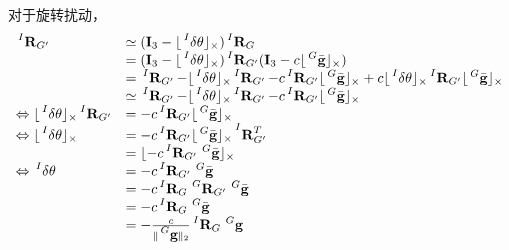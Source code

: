 \documentclass{article}
\begin{document}
\par
对于旋转扰动，
\begin{equation}
    \begin{array}{ll}
        \sideset{^I}{}{\mathop{\textbf{R}_{G'}}}&\simeq (\textbf{I}_3-
        \lfloor\sideset{^I}{}{\mathop{\delta\mathbf{\theta}}}\rfloor_{\times})\sideset{^I}{}{\mathop{\textbf{R}_{G}}}\\
        &=(\textbf{I}_3-\lfloor\sideset{^I}{}{\mathop{\delta\mathbf{\theta}}}\rfloor_{\times})\sideset{^I}{}{\mathop{\textbf{R}_{G'}}}
        (\textbf{I}_3-c\lfloor\sideset{^G}{}{\mathop{\bar{\textbf{g}}}}\rfloor_{\times})\\
        &=\sideset{^I}{}{\mathop{\textbf{R}_{G'}}}-\lfloor\sideset{^I}{}{\mathop{\delta\mathbf{\theta}}}\rfloor_{\times}
        \sideset{^I}{}{\mathop{\textbf{R}_{G'}}}-c\sideset{^I}{}{\mathop{\textbf{R}_{G'}}}
        \lfloor\sideset{^G}{}{\mathop{\bar{\textbf{g}}}}\rfloor_{\times}
        +c\lfloor\sideset{^I}{}{\mathop{\delta\mathbf{\theta}}}\rfloor_{\times}\sideset{^I}{}{\mathop{\textbf{R}_{G'}}}
        \lfloor\sideset{^G}{}{\mathop{\bar{\textbf{g}}}}\rfloor_{\times}\\
        &\simeq \sideset{^I}{}{\mathop{\textbf{R}_{G'}}}-\lfloor\sideset{^I}{}{\mathop{\delta\mathbf{\theta}}}\rfloor_{\times}
        \sideset{^I}{}{\mathop{\textbf{R}_{G'}}}-c\sideset{^I}{}{\mathop{\textbf{R}_{G'}}}
        \lfloor\sideset{^G}{}{\mathop{\bar{\textbf{g}}}}\rfloor_{\times}\\
        \Leftrightarrow \lfloor\sideset{^I}{}{\mathop{\delta\mathbf{\theta}}}\rfloor_{\times}
        \sideset{^I}{}{\mathop{\textbf{R}_{G'}}}&=-c\sideset{^I}{}{\mathop{\textbf{R}_{G'}}}
        \lfloor\sideset{^G}{}{\mathop{\bar{\textbf{g}}}}\rfloor_{\times}\\
        \Leftrightarrow \lfloor\sideset{^I}{}{\mathop{\delta\mathbf{\theta}}}\rfloor_{\times}
        &=-c\sideset{^I}{}{\mathop{\textbf{R}_{G'}}}
        \lfloor\sideset{^G}{}{\mathop{\bar{\textbf{g}}}}\rfloor_{\times}\sideset{^I}{}{\mathop{\textbf{R}_{G'}^T}}\\
        &=\lfloor -c\sideset{^I}{}{\mathop{\textbf{R}_{G'}}}\sideset{^G}{}{\mathop{\bar{\textbf{g}}}}\rfloor_{\times}\\
        \Leftrightarrow \sideset{^I}{}{\mathop{\delta\mathbf{\theta}}}&=
        -c\sideset{^I}{}{\mathop{\textbf{R}_{G'}}}\sideset{^G}{}{\mathop{\bar{\textbf{g}}}}\\
        &=-c\sideset{^I}{}{\mathop{\textbf{R}_{G}}}\sideset{^{G}}{}{\mathop{\textbf{R}_{G'}}}\sideset{^G}{}{\mathop{\bar{\textbf{g}}}}\\
        &=-c\sideset{^I}{}{\mathop{\textbf{R}_{G}}}\sideset{^G}{}{\mathop{\bar{\textbf{g}}}}\\
        &=-\frac{c}{\lVert\sideset{^G}{}{\mathop{\textbf{g}}}\rVert_2}\sideset{^I}{}{\mathop{\textbf{R}_{G}}}\sideset{^G}{}{\mathop{\textbf{g}}}
    \end{array}
\end{equation}
\end{document}
